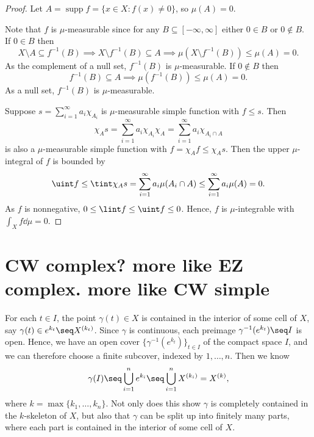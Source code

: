 \documentclass[12pt]{article}
\begin{document}
\begin{proof}
    Let $A = \operatorname{supp} f = \{x \in X : f(x) \ne 0\}$, so $\mu(A) = 0$.

    Note that $f$ is $\mu$-measurable since for any $B \subseteq [-\infty, \infty]$ either $0 \in B$ or $0 \notin B$.
    If $0 \in B$ then
    \[
        X \setminus A \subseteq f^{-1}(B) \implies X \setminus f^{-1}(B) \subseteq A \implies \mu(X \setminus f^{-1}(B)) \leq \mu(A) = 0.
    \]
    As the complement of a null set, $f^{-1}(B)$ is $\mu$-measurable.
    If $0 \notin B$ then
    \[
        f^{-1}(B) \subseteq A \implies \mu(f^{-1}(B)) \leq \mu(A) = 0.
    \]
    As a null set, $f^{-1}(B)$ is $\mu$-measurable.

    Suppose $s = \sum_{i=1}^{\infty} a_i \chi_{A_i}$ is $\mu$-measurable simple function with $f \leq s$.
    Then
    \[
        \chi_A s 
            = \sum_{i=1}^{\infty} a_i \chi_{A_i} \chi_A 
            = \sum_{i=1}^{\infty} a_i \chi_{A_i \cap A}
    \]
    is also a $\mu$-measurable simple function with $f = \chi_A f \leq \chi_A s$.
    Then the upper $\mu$-integral of $f$ is bounded by
    \[
        \uint f
            \leq \tint \chi_A s
            = \sum_{i=1}^{\infty} a_i \mu(A_i \cap A)
            \leq \sum_{i=1}^{\infty} a_i \mu(A)
            = 0.
    \]
    As $f$ is nonnegative, $0 \leq \lint f \leq \uint f \leq 0$. Hence, $f$ is $\mu$-integrable with $\int_X f \dd\mu = 0$.
\end{proof}

\begin{corollary}
    
\end{corollary}


\section*{CW complex? more like EZ complex. more like CW simple}

For each $t \in I$, the point $\gamma(t) \in X$ is contained in the interior of some cell of $X$, say $\gamma(t) \in e^{k_t} \seq X^{(k_t)}$.
    Since $\gamma$ is continuous, each preimage $\gamma^{-1}(e^{k_t}) \seq I$ is open.
    Hence, we have an open cover $\{\gamma^{-1}(e^{k_t})\}_{t \in I}$ of the compact space $I$, and we can therefore choose a finite subcover, indexed by $1, \dots, n$.
    Then we know
    \[
        \gamma(I)
            \seq \bigcup_{i=1}^{n} e^{k_i}
            \seq \bigcup_{i=1}^{n} X^{(k_i)}
            = X^{(k)},
    \]
    where $k = \max\{k_1, \dots, k_n\}$. Not only does this show $\gamma$ is completely contained in the $k$-skeleton of $X$, but also that $\gamma$ can be split up into finitely many parts, where each part is contained in the interior of some cell of $X$.
\end{document}
